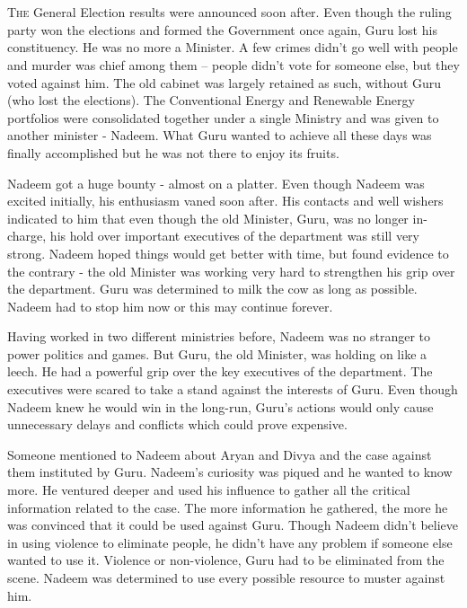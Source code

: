 \chapter{}

\lettrine{T}{he} General Election results were announced soon after. Even though the ruling
party won the elections and formed the Government once again, Guru lost his
constituency. He was no more a Minister. A few crimes didn't go well with people
and murder was chief among them – people didn't vote for someone else, but they
voted against him. The old cabinet was largely retained as such, without Guru
(who lost the elections). The Conventional Energy and Renewable Energy
portfolios were consolidated together under a single Ministry and was given to
another minister - Nadeem. What Guru wanted to achieve all these days was
finally accomplished but he was not there to enjoy its fruits.

Nadeem got a huge bounty - almost on a platter. Even though Nadeem was excited
initially, his enthusiasm vaned soon after. His contacts and well wishers
indicated to him that even though the old Minister, Guru, was no longer
in-charge, his hold over important executives of the department was still very
strong. Nadeem hoped things would get better with time, but found evidence to
the contrary - the old Minister was working very hard to strengthen his grip
over the department. Guru was determined to milk the cow as long as possible.
Nadeem had to stop him now or this may continue forever.

Having worked in two different ministries before, Nadeem was no stranger to
power politics and games. But Guru, the old Minister, was holding on like a
leech. He had a powerful grip over the key executives of the department. The
executives were scared to take a stand against the interests of Guru. Even
though Nadeem knew he would win in the long-run, Guru's actions would only cause
unnecessary delays and conflicts which could prove expensive.

Someone mentioned to Nadeem about Aryan and Divya and the case against them
instituted by Guru. Nadeem's curiosity was piqued and he wanted to know more. He
ventured deeper and used his influence to gather all the critical information
related to the case. The more information he gathered, the more he was convinced
that it could be used against Guru. Though Nadeem didn't believe in using
violence to eliminate people, he didn't have any problem if someone else wanted
to use it. Violence or non-violence, Guru had to be eliminated from the scene.
Nadeem was determined to use every possible resource to muster against him.

